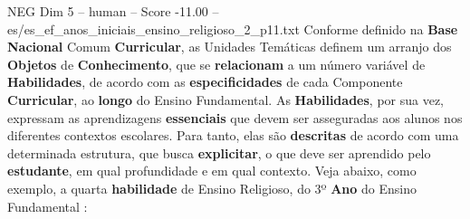 \begin{textsample}{NEG Dim 5 – human – Score -11.00 – es/es\_ef\_anos\_iniciais\_ensino\_religioso\_2\_p11.txt}  \label{ex:f5_neg_001}
Conforme definido na \textbf{Base} \textbf{Nacional} Comum \textbf{Curricular}, as Unidades Temáticas definem um arranjo dos \textbf{Objetos} de \textbf{Conhecimento}, que se \textbf{relacionam} a um número variável de \textbf{Habilidades}, de acordo com as \textbf{especificidades} de cada Componente \textbf{Curricular}, ao \textbf{longo} do Ensino Fundamental.
As \textbf{Habilidades}, por sua vez, expressam as aprendizagens \textbf{essenciais} que devem ser asseguradas aos alunos nos diferentes contextos escolares.
Para tanto, elas são \textbf{descritas} de acordo com uma determinada estrutura, que busca \textbf{explicitar}, o que deve ser aprendido pelo \textbf{estudante}, em qual profundidade e em qual contexto.
Veja abaixo, como exemplo, a quarta \textbf{habilidade} de Ensino Religioso, do 3º \textbf{Ano} do Ensino Fundamental :

\end{textsample}

